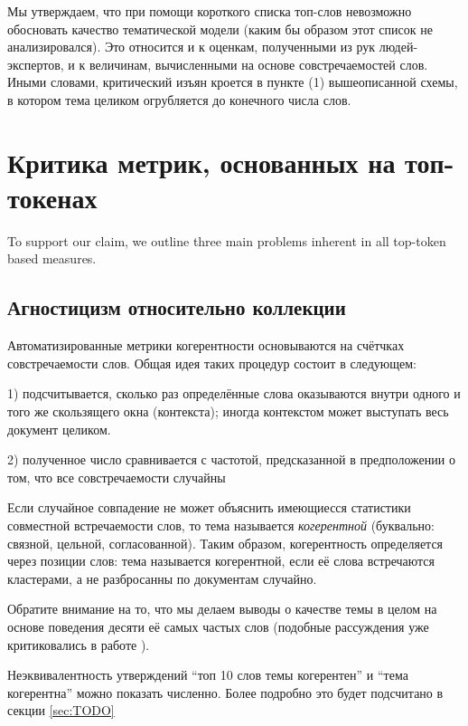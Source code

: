 Мы утверждаем, что при помощи короткого списка топ-слов невозможно обосновать качество тематической модели (каким бы образом этот список не анализировался). Это относится и к оценкам, полученными из рук людей-экспертов, и к величинам, вычисленными на основе совстречаемостей слов. Иными словами, критический изъян кроется в пункте (1) вышеописанной схемы, в котором тема целиком огрубляется до конечного числа слов.

\section{Критика метрик, основанных на топ-токенах}


To support our claim, we outline three main problems inherent in all top-token based measures. 

\subsection{Агностицизм относительно коллекции}

Автоматизированные метрики когерентности основываются на счётчках совстречаемости слов. Общая идея таких процедур состоит в следующем: 

1) подсчитывается, сколько раз определённые слова оказываются внутри одного и того же скользящего окна (контекста); иногда контекстом может выступать весь документ целиком.

2) полученное число сравнивается с частотой, предсказанной в предположении о том, что все совстречаемости случайны

Если случайное совпадение не может объяснить имеющиесся статистики совместной встречаемости слов, то тема называется \textit{когерентной} (буквально: связной, цельной, согласованной). Таким образом, когерентность определяется через позиции слов: тема называется когерентной, если её слова встречаются кластерами, а не разбросанны по документам случайно.

Обратите внимание на то, что мы делаем выводы о качестве темы в целом на основе поведения десяти её самых частых слов (подобные рассуждения уже критиковались в работе  \cite{dh_sea}). 

Неэквивалентность утверждений ``топ 10 слов темы когерентен'' и ``тема когерентна'' можно показать численно. Более подробно это будет подсчитано в секции \ref{sec:TODO}


